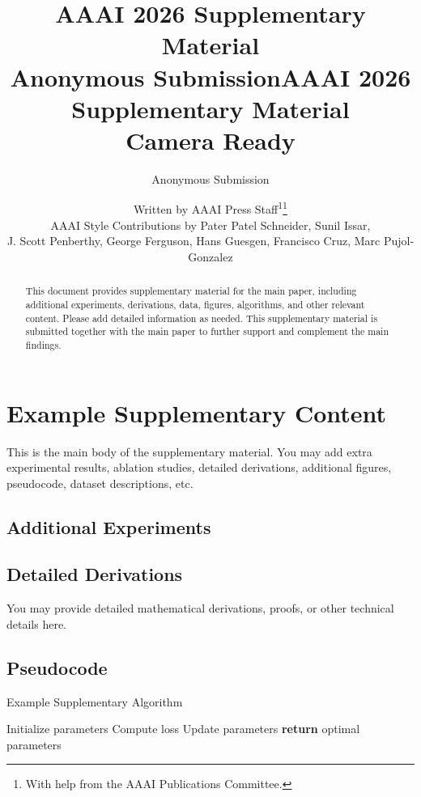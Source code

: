 \documentclass[letterpaper]{article} %
\title{AAAI 2026 Supplementary Material\\Anonymous Submission}
\title{AAAI 2026 Supplementary Material\\Camera Ready}
\author{
    Anonymous Submission
}
\author{
    Written by AAAI Press Staff\textsuperscript{\rm 1}\thanks{With help from the AAAI Publications Committee.}\\
    AAAI Style Contributions by Pater Patel Schneider,
    Sunil Issar,\\
    J. Scott Penberthy,
    George Ferguson,
    Hans Guesgen,
    Francisco Cruz\equalcontrib,
    Marc Pujol-Gonzalez\equalcontrib
}
\begin{document}
\maketitle

\begin{abstract}
This document provides supplementary material for the main paper, including additional experiments, derivations, data, figures, algorithms, and other relevant content. Please add detailed information as needed. This supplementary material is submitted together with the main paper to further support and complement the main findings.
\end{abstract}


\section{Example Supplementary Content}

This is the main body of the supplementary material. You may add extra experimental results, ablation studies, detailed derivations, additional figures, pseudocode, dataset descriptions, etc.

\subsection{Additional Experiments}


\subsection{Detailed Derivations}

You may provide detailed mathematical derivations, proofs, or other technical details here.

\subsection{Pseudocode}

\begin{algorithm}[h]
\caption{Example Supplementary Algorithm}
\begin{algorithmic}[1]
\STATE Initialize parameters
    \STATE Compute loss
    \STATE Update parameters
\ENDFOR
\STATE \textbf{return} optimal parameters
\end{algorithmic}
\end{algorithm}



\end{document}
